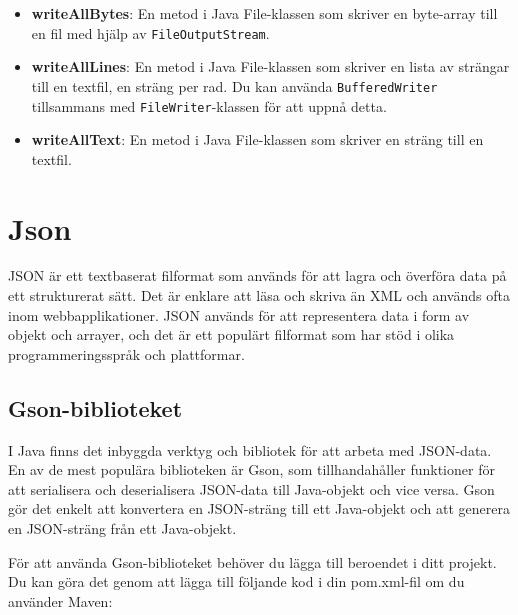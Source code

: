 \begin{itemize}
  i en textfil och returnerar det som en uppräkningsbar sekvens av
  strängar med hjälp av \texttt{BufferedReader} och \texttt{FileReader}.
\item
  \textbf{writeAllBytes}: En metod i Java File-klassen som skriver en
  byte-array till en fil med hjälp av \texttt{FileOutputStream}.
\item
  \textbf{writeAllLines}: En metod i Java File-klassen som skriver en
  lista av strängar till en textfil, en sträng per rad. Du kan använda
  \texttt{BufferedWriter} tillsammans med \texttt{FileWriter}-klassen
  för att uppnå detta.
\item
  \textbf{writeAllText}: En metod i Java File-klassen som skriver en
  sträng till en textfil.
\end{itemize}

\hypertarget{json}{%
\section{Json}\label{json}}

JSON är ett textbaserat filformat som används för att lagra och överföra
data på ett strukturerat sätt. Det är enklare att läsa och skriva än XML
och används ofta inom webbapplikationer. JSON används för att
representera data i form av objekt och arrayer, och det är ett populärt
filformat som har stöd i olika programmeringsspråk och plattformar.

\hypertarget{gson-biblioteket}{%
\subsection{Gson-biblioteket}\label{gson-biblioteket}}

I Java finns det inbyggda verktyg och bibliotek för att arbeta med
JSON-data. En av de mest populära biblioteken är Gson, som
tillhandahåller funktioner för att serialisera och deserialisera
JSON-data till Java-objekt och vice versa. Gson gör det enkelt att
konvertera en JSON-sträng till ett Java-objekt och att generera en
JSON-sträng från ett Java-objekt.

För att använda Gson-biblioteket behöver du lägga till beroendet i ditt
projekt. Du kan göra det genom att lägga till följande kod i din
pom.xml-fil om du använder Maven:

